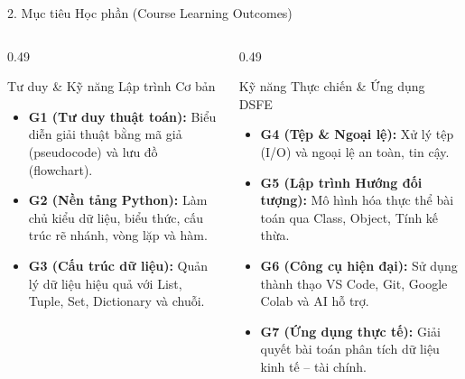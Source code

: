 \documentclass[aspectratio=169, 10pt]{beamer}
\begin{document}
\begin{frame}{2. Mục tiêu Học phần (Course Learning Outcomes)}
  \begin{columns}[T]
    \begin{column}{0.49\textwidth}
      \begin{cbox}[primaryblue]{Tư duy \& Kỹ năng Lập trình Cơ bản}
        \footnotesize
        \begin{itemize}\setlength{\itemsep}{3pt}
          \item \textbf{G1 (Tư duy thuật toán):} Biểu diễn giải thuật bằng mã giả (pseudocode) và lưu đồ (flowchart).
          \item \textbf{G2 (Nền tảng Python):} Làm chủ kiểu dữ liệu, biểu thức, cấu trúc rẽ nhánh, vòng lặp và hàm.
          \item \textbf{G3 (Cấu trúc dữ liệu):} Quản lý dữ liệu hiệu quả với List, Tuple, Set, Dictionary và chuỗi.
        \end{itemize}
      \end{cbox}
    \end{column}
    \begin{column}{0.49\textwidth}
      \begin{cbox}[secondarygreen]{Kỹ năng Thực chiến \& Ứng dụng DSFE}
        \footnotesize
        \begin{itemize}\setlength{\itemsep}{3pt}
          \item \textbf{G4 (Tệp \& Ngoại lệ):} Xử lý tệp (I/O) và ngoại lệ an toàn, tin cậy.
          \item \textbf{G5 (Lập trình Hướng đối tượng):} Mô hình hóa thực thể bài toán qua Class, Object, Tính kế thừa.
          \item \textbf{G6 (Công cụ hiện đại):} Sử dụng thành thạo VS Code, Git, Google Colab và AI hỗ trợ.
          \item \textbf{G7 (Ứng dụng thực tế):} Giải quyết bài toán phân tích dữ liệu kinh tế -- tài chính.
        \end{itemize}
      \end{cbox}
    \end{column}
  \end{columns}
\end{frame}
\end{document}
